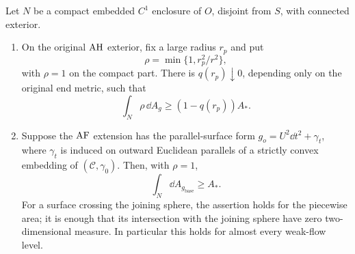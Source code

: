 \begin{lemma}\label{lem:area-projection}
Let $N$ be a compact embedded $C^1$ enclosure of $O$, disjoint from
$S$, with connected exterior.
\begin{enumerate}[label=\textup{(\roman*)}]
\item On the original $\mathrm{AH}$ exterior, fix a large radius $r_p$ and put
\begin{equation}\label{eq:flow-ah-weight}
 \rho=\min\{1,r_p^2/r^2\},
\end{equation}
with $\rho=1$ on the compact part.  There is $q(r_p)\downarrow0$,
depending only on the original end metric, such that
\begin{equation}\label{eq:flow-ah-projection}
 \int_N\rho\,\dd A_g\ge(1-q(r_p))A_*.
\end{equation}
\item Suppose the $\mathrm{AF}$ extension has the parallel-surface form
$g_o=U^2\dd t^2+\gamma_t$, where $\gamma_t$ is induced on outward
Euclidean parallels of a strictly convex embedding of
$(\mathcal C,\gamma_0)$.  Then, with $\rho=1$,
\begin{equation}\label{eq:flow-af-projection}
 \int_N\dd A_{g_{\mathrm{base}}}\ge A_*.
\end{equation}
For a surface crossing the joining sphere, the assertion holds for
the piecewise area; it is enough that its intersection with the
joining sphere have zero two-dimensional measure.  In particular
this holds for almost every weak-flow level.
\end{enumerate}
\end{lemma}

